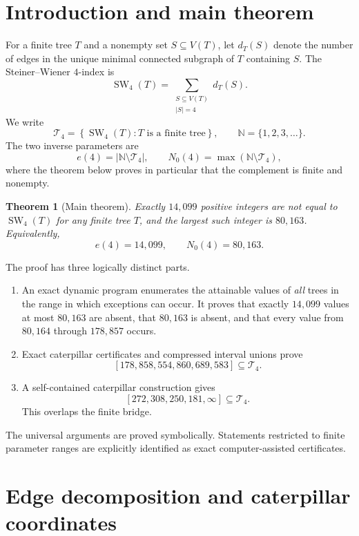 \documentclass[11pt]{article}
\newtheorem{theorem}{Theorem}[section]
\theoremstyle{definition}
\theoremstyle{remark}
\newcommand{\SW}{\operatorname{SW}_4}
\newcommand{\Tfour}{\mathcal T_4}
\newcommand{\N}{\mathbb N}
\newcommand{\set}[1]{\left\{#1\right\}}
\newcommand{\interval}[2]{\left[#1,#2\right]}
\begin{document}
\section{Introduction and main theorem}

For a finite tree $T$ and a nonempty set $S\subseteq V(T)$, let $d_T(S)$
denote the number of edges in the unique minimal connected subgraph of $T$
containing $S$.  The Steiner--Wiener $4$-index is
\begin{equation}\label{eq:def-sw}
  \SW(T)=
  \sum_{\substack{S\subseteq V(T)\\ |S|=4}}d_T(S).
\end{equation}
We write
\[
  \Tfour=\set{\SW(T):T\text{ is a finite tree}},
  \qquad
  \N=\{1,2,3,\ldots\}.
\]
The two inverse parameters are
\[
  e(4)=\left|\N\setminus\Tfour\right|,
  \qquad
  N_0(4)=\max\left(\N\setminus\Tfour\right),
\]
where the theorem below proves in particular that the complement is finite and
nonempty.

\begin{theorem}[Main theorem]\label{thm:main}
Exactly $14{,}099$ positive integers are not equal to $\SW(T)$ for any finite
tree $T$, and the largest such integer is $80{,}163$.  Equivalently,
\[
  \boxed{e(4)=14{,}099},
  \qquad
  \boxed{N_0(4)=80{,}163}.
\]
\end{theorem}

The proof has three logically distinct parts.
\begin{enumerate}[label=(\roman*)]
\item An exact dynamic program enumerates the attainable values of
      \emph{all} trees in the range in which exceptions can occur.  It proves
      that exactly $14{,}099$ values at most $80{,}163$ are absent, that
      $80{,}163$ is absent, and that every value from $80{,}164$ through
      $178{,}857$ occurs.
\item Exact caterpillar certificates and compressed interval unions prove
      \[
        \interval{178{,}858}{554{,}860{,}689{,}583}
        \subseteq\Tfour.
      \]
\item A self-contained caterpillar construction gives
      \[
        \interval{272{,}308{,}250{,}181}{\infty}\subseteq\Tfour.
      \]
      This overlaps the finite bridge.
\end{enumerate}
The universal arguments are proved symbolically.  Statements restricted to
finite parameter ranges are explicitly identified as exact computer-assisted
certificates.

\section{Edge decomposition and caterpillar coordinates}
\end{document}
